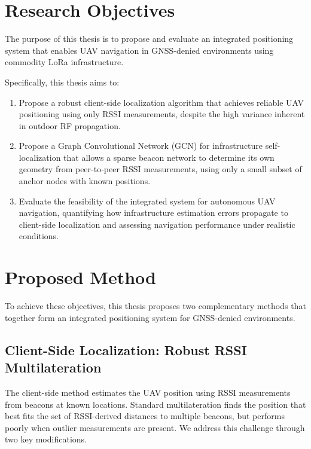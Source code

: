 \documentclass[master,final,11pt]{iscs-thesis}
\begin{document}
\section{Research Objectives}
\label{sec:objectives}

The purpose of this thesis is to propose and evaluate an integrated positioning system that enables UAV navigation in GNSS-denied environments using commodity LoRa infrastructure.

Specifically, this thesis aims to:
\begin{enumerate}
    \item Propose a robust client-side localization algorithm that achieves reliable UAV positioning using only RSSI measurements, despite the high variance inherent in outdoor RF propagation.
    \item Propose a Graph Convolutional Network (GCN) for infrastructure self-localization that allows a sparse beacon network to determine its own geometry from peer-to-peer RSSI measurements, using only a small subset of anchor nodes with known positions.
    \item Evaluate the feasibility of the integrated system for autonomous UAV navigation, quantifying how infrastructure estimation errors propagate to client-side localization and assessing navigation performance under realistic conditions.
\end{enumerate}

\section{Proposed Method}
\label{sec:proposed_method}

To achieve these objectives, this thesis proposes two complementary methods that together form an integrated positioning system for GNSS-denied environments.

\subsection{Client-Side Localization: Robust RSSI Multilateration}

The client-side method estimates the UAV position using RSSI measurements from beacons at known locations.
Standard multilateration finds the position that best fits the set of RSSI-derived distances to multiple beacons, but performs poorly when outlier measurements are present.
We address this challenge through two key modifications.
\end{document}
